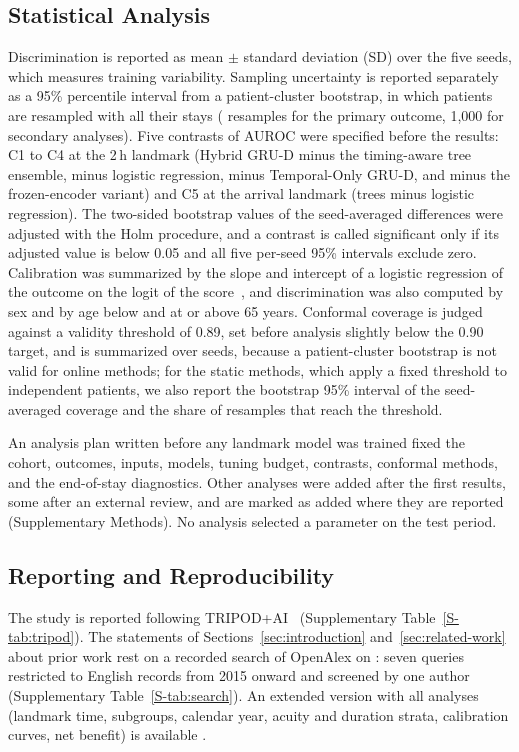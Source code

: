 \subsection{Statistical Analysis}
\label{sec:methods-stats}

Discrimination is reported as mean $\pm$ standard deviation (SD) over the five seeds, which measures training variability. Sampling uncertainty is reported
separately as a 95\% percentile interval from a patient-cluster bootstrap, in which patients are resampled with all their stays (\RVBootMain{} resamples for the
primary outcome, 1,000 for secondary analyses). Five contrasts of AUROC were specified before the results: C1 to C4 at the 2\,h landmark (Hybrid GRU-D minus the timing-aware tree
ensemble, minus logistic regression, minus Temporal-Only GRU-D, and minus the frozen-encoder variant) and C5 at the arrival landmark (trees minus logistic regression). The two-sided bootstrap values of the seed-averaged differences were adjusted with the Holm procedure, and a contrast is called significant only if its adjusted value is below 0.05 and all five per-seed 95\% intervals exclude zero. Calibration was summarized by the slope and intercept of a logistic regression of the outcome on the logit of the score~\cite{vancalster2019calibration}, and discrimination was also computed by sex and by age below and at or above 65 years.
Conformal coverage is judged against a validity threshold of 0.89, set before analysis slightly below the 0.90 target, and is summarized over seeds, because a
patient-cluster bootstrap is not valid for online methods; for the static methods, which apply a fixed threshold to independent patients, we also report the bootstrap 95\% interval of the seed-averaged coverage and the share of resamples that reach the threshold.

An analysis plan written before any landmark model was trained fixed the cohort, outcomes, inputs, models, tuning budget, contrasts, conformal methods, and the end-of-stay diagnostics. Other analyses were added after the first results, some after an external review, and are marked as added where they are reported (Supplementary Methods). No analysis selected a parameter on the test period.

\subsection{Reporting and Reproducibility}
\label{sec:methods-reporting}

The study is reported following TRIPOD+AI~\cite{collins2024tripodai} (Supplementary
Table~\ref{S-tab:tripod}). The statements of Sections~\ref{sec:introduction} and~\ref{sec:related-work} about prior work rest on a recorded search of OpenAlex on
\mbox{\RVLitDate{}}: seven queries restricted to English records from 2015 onward and screened by one author (Supplementary Table~\ref{S-tab:search}). An extended version with all analyses (landmark time, subgroups, calendar year, acuity and duration strata, calibration curves, net benefit) is available .
